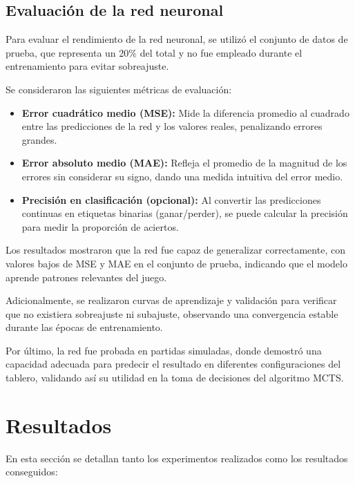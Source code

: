 \documentclass[conference,a4paper]{IEEEtran}
\begin{document}
\subsection{Evaluación de la red neuronal}
Para evaluar el rendimiento de la red neuronal, se utilizó el conjunto de datos de prueba, que representa un 20\% del total y no fue empleado durante el entrenamiento para evitar sobreajuste.

Se consideraron las siguientes métricas de evaluación:

\begin{itemize}
    \item \textbf{Error cuadrático medio (MSE):} Mide la diferencia promedio al cuadrado entre las predicciones de la red y los valores reales, penalizando errores grandes.
    \item \textbf{Error absoluto medio (MAE):} Refleja el promedio de la magnitud de los errores sin considerar su signo, dando una medida intuitiva del error medio.
    \item \textbf{Precisión en clasificación (opcional):} Al convertir las predicciones continuas en etiquetas binarias (ganar/perder), se puede calcular la precisión para medir la proporción de aciertos.
\end{itemize}

Los resultados mostraron que la red fue capaz de generalizar correctamente, con valores bajos de MSE y MAE en el conjunto de prueba, indicando que el modelo aprende patrones relevantes del juego.

Adicionalmente, se realizaron curvas de aprendizaje y validación para verificar que no existiera sobreajuste ni subajuste, observando una convergencia estable durante las épocas de entrenamiento.

Por último, la red fue probada en partidas simuladas, donde demostró una capacidad adecuada para predecir el resultado en diferentes configuraciones del tablero, validando así su utilidad en la toma de decisiones del algoritmo MCTS.

\section{Resultados}

En esta sección se detallan tanto los experimentos realizados como los resultados conseguidos:
\end{document}
